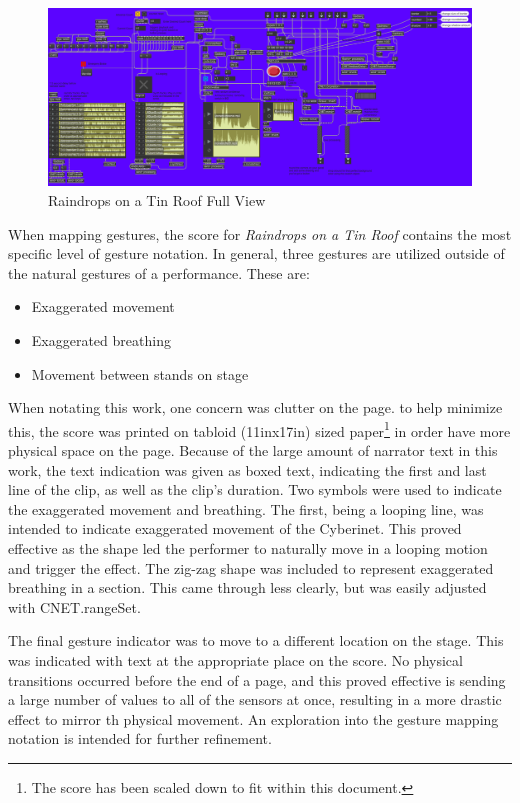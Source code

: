 \begin{figure}
    \centering
    \includegraphics[scale=0.6]{diagrams/maxPatches/raindropsRaw.png}
    \caption{Raindrops on a Tin Roof Full View}
    \label{fig:raindropsRaw}
\end{figure}

When mapping gestures, the score for \textit{Raindrops on a Tin Roof} contains the most specific level of gesture notation. In general, three gestures are utilized outside of the natural gestures of a performance. These are: 

\begin{itemize}
    \item Exaggerated movement
    \item Exaggerated breathing
    \item Movement between stands on stage
\end{itemize}

When notating this work, one concern was clutter on the page. to help minimize this, the score was printed on tabloid (11inx17in) sized paper\footnote{The score has been scaled down to fit within this document.} in order have more physical space on the page. Because of the large amount of narrator text in this work, the text indication was given as boxed text, indicating the first and last line of the clip, as well as the clip's duration. Two symbols were used to indicate the exaggerated movement and breathing. The first, being a looping line, was intended to indicate exaggerated movement of the Cyberinet. This proved effective as the shape led the performer to naturally move in a looping motion and trigger the effect. The zig-zag shape was included to represent exaggerated breathing in a section. This came through less clearly, but was easily adjusted with CNET.rangeSet.

The final gesture indicator was to move to a different location on the stage. This was indicated with text at the appropriate place on the score. No physical transitions occurred before the end of a page, and this proved effective is sending a large number of values to all of the sensors at once, resulting in a more drastic effect to mirror th physical movement. An exploration into the gesture mapping notation is intended for further refinement.

